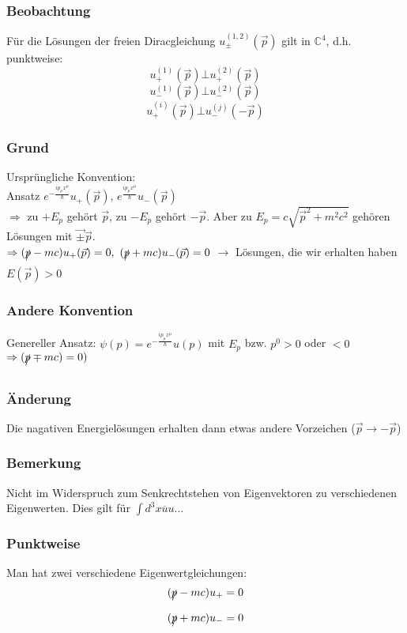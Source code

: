 \documentclass[twoside,a4paper]{scrartcl}
\newcommand{\C}{\mathbb{C}}
\renewcommand{\1}{\mathds{1}}
\newcommand{\Ra}{\Rightarrow}
\newcommand{\ra}{\rightarrow}
\renewcommand{\C}{\mathbb{C}}
\begin{document}
\subsubsection*{Beobachtung}
Für die Lösungen der freien Diracgleichung $u_{\pm}^{(1,2)}(\vec p)$ gilt in $\C^4$, d.h. punktweise:
$$u_+^{(1)}(\vec p) \bot u_+^{(2)}(\vec p)$$
$$u_-^{(1)}(\vec p) \bot u_-^{(2)}(\vec p)$$
$$u_+^{(i)}(\vec p) \bot u_-^{(j)}(-\vec p)$$
\subsubsection*{Grund}
Ursprüngliche Konvention:\\
Ansatz $e^{-\frac{i p_\mu x^\mu}{\hbar}}u_+(\vec p)$, $e^{\frac{i p_\mu x^\mu}{\hbar}}u_-(\vec p)$\\
$\Ra $ zu $+E_p$ gehört $\vec p$, zu $-E_p$ gehört $-\vec p$. Aber zu $E_p=c\sqrt{\vec p^2+m^2c^2}$ gehören Lösungen mit $\vec \pm \vec p$.\\
$\Ra (\xout{p}-mc)u_+(\vec p)=0, \ (\xout{p}+mc)u_-(\vec p)=0$
$\ra$ Lösungen, die wir erhalten haben $E(\vec p) >0$
\subsubsection*{Andere Konvention}
 Genereller Ansatz: $\psi(p)=e^{-\frac{i p_\mu x^\mu}{\hbar}}u(p)$ mit $E_p$ bzw. $p^0>0$ oder $<0$ $\Ra (\xout{p}\mp mc)=0)$
\subsubsection*{Änderung}
Die nagativen Energielösungen erhalten dann etwas andere Vorzeichen ($\vec p \ra -\vec p$)
\subsubsection*{Bemerkung}
Nicht im Widerspruch zum Senkrechtstehen von Eigenvektoren zu verschiedenen Eigenwerten. Dies gilt für $\int d^3x \overline {u}u...$
\subsubsection*{Punktweise}
Man hat zwei verschiedene Eigenwertgleichungen:
$$(\xout{p}-mc)u_+=0$$
$$(\xout{p}+mc)u_-=0$$
\end{document}
